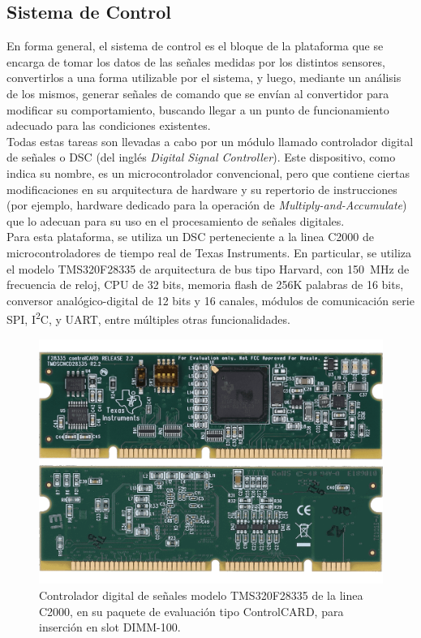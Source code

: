\subsection{Sistema de Control}

En forma general, el sistema de control es el bloque de la plataforma que se encarga de tomar los datos de las señales medidas por los distintos sensores, convertirlos a una forma utilizable por el sistema, y luego, mediante un análisis de los mismos, generar señales de comando que se envían al convertidor para modificar su comportamiento, buscando llegar a un punto de funcionamiento adecuado para las condiciones existentes.\\

Todas estas tareas son llevadas a cabo por un módulo llamado {\Medium controlador digital de señales} o DSC (del inglés \textit{Digital Signal Controller}). Este dispositivo, como indica su nombre, es un microcontrolador convencional, pero que contiene ciertas modificaciones en su arquitectura de hardware y su repertorio de instrucciones (por ejemplo, hardware dedicado para la operación de \textit{Multiply-and-Accumulate}) que lo adecuan para su uso en el procesamiento de señales digitales.\\

Para esta plataforma, se utiliza un DSC perteneciente a la linea {\Medium C2000} de microcontroladores de tiempo real de Texas Instruments. En particular, se utiliza el modelo {\Medium TMS320F28335} de arquitectura de bus tipo Harvard, con \SI[]{150}{\mega\hertz} de frecuencia de reloj, CPU de 32 bits, memoria flash de 256K palabras de 16 bits, conversor analógico-digital de 12 bits y 16 canales, módulos de comunicación serie SPI, I\textsuperscript{2}C, y UART, entre múltiples otras funcionalidades.\textsuperscript{\cite{DSP-Datasheet}}\\

\begin{figure}[h]
    \centering
    \includegraphics[scale=0.22]{Imagenes/ControlCARD.png}
    \caption{Controlador digital de señales modelo TMS320F28335 de la linea C2000, en su paquete de evaluación tipo ControlCARD, para inserción en slot DIMM-100.}
    \label{ControlCARD}
\end{figure}